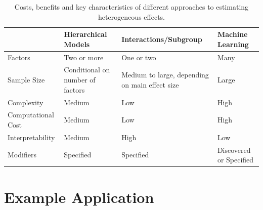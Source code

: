 \documentclass[12pt]{article}
\begin{document}
\begin{table}
\begin{tabular}{|p{1in}|p{1.5in}|p{1.5in}|p{1.5in}|} \hline
                 & Hierarchical Models & Interactions/Subgroup & Machine Learning \\
\hline
Factors              & Two or more          & One or two         & Many \\ \hline
Sample Size          & Conditional on number of factors            & Medium to large, depending on main effect size    & Large \\ \hline
Complexity           & Medium             & Low                & High \\ \hline
Computational Cost   & Medium             & Low                & High \\ \hline
Interpretability     & Medium             & High               & Low \\ \hline
Modifiers            & Specified          & Specified      & Discovered or Specified \\
\hline
\end{tabular}
\caption{Costs, benefits and key characteristics of different approaches to estimating heterogeneous effects.}
\label{tab:tools-det}
\end{table}






\section{Example Application} 
\end{document}

